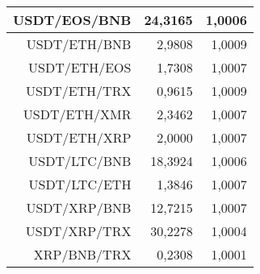 \begin{table}
\begin{tabular}{|| r | r | r ||}
 \hline USDT/EOS/BNB & 24,3165 & 1,0006\\ 
 \hline USDT/ETH/BNB & 2,9808 & 1,0009\\ 
 \hline USDT/ETH/EOS & 1,7308 & 1,0007\\ 
 \hline USDT/ETH/TRX & 0,9615 & 1,0009\\ 
 \hline USDT/ETH/XMR & 2,3462 & 1,0007\\ 
 \hline USDT/ETH/XRP & 2,0000 & 1,0007\\ 
 \hline USDT/LTC/BNB & 18,3924 & 1,0006\\ 
 \hline USDT/LTC/ETH & 1,3846 & 1,0007\\ 
 \hline USDT/XRP/BNB & 12,7215 & 1,0007\\ 
 \hline USDT/XRP/TRX & 30,2278 & 1,0004\\ 
 \hline XRP/BNB/TRX & 0,2308 & 1,0001\\ 
 \hline
\end{tabular}
\end{table}